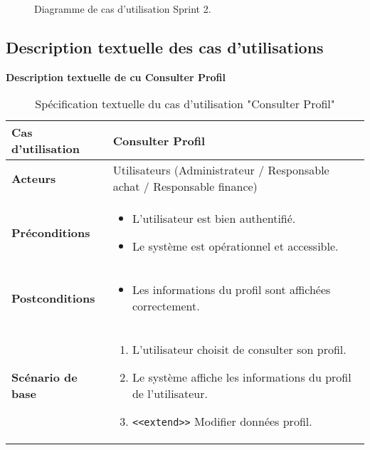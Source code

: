 \documentclass[a4paper,11pt]{report}
\begin{document}
\begin{figure}[H]
  \centering
  \setlength{\fboxrule}{1pt}
  \setlength{\fboxsep}{3pt}
  \caption{Diagramme de cas d’utilisation Sprint 2.}
  \label{fig:clone-result}
\end{figure}
\subsection{ Description textuelle des cas d’utilisations}

\textbf{Description textuelle de cu Consulter Profil }

\begin{table}[H]
  \centering
  \renewcommand{\arraystretch}{1.5}
  \caption{Spécification textuelle du cas d'utilisation "Consulter Profil"}
  \begin{tabularx}{\textwidth}{|l|X|}
    \hline
    \textbf{Cas d'utilisation} & Consulter Profil \\ \hline
    \textbf{Acteurs}           & Utilisateurs (Administrateur / Responsable achat / Responsable finance) \\ \hline
    \textbf{Préconditions}     &
    \begin{itemize}[leftmargin=*]
      \item L’utilisateur est bien authentifié.
      \item Le système est opérationnel et accessible.
    \end{itemize} \\ \hline
    \textbf{Postconditions}    &
    \begin{itemize}[leftmargin=*]
      \item Les informations du profil sont affichées correctement.
    \end{itemize} \\ \hline
    \textbf{Scénario de base}  &
    \begin{enumerate}[leftmargin=*]
      \item L’utilisateur choisit de consulter son profil.
      \item Le système affiche les informations du profil de l’utilisateur.
      \item \texttt{<<extend>>} Modifier données profil.
    \end{enumerate} \\ \hline
  \end{tabularx}
\end{table}
\end{document}
